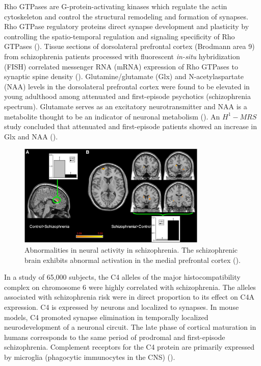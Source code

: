 \documentclass[]{article}
\begin{document}
		Rho GTPases are G-protein-activating kinases which regulate the actin cytoskeleton and control the structural remodeling and formation of synapses. Rho GTPase regulatory proteins direct synapse development and plasticity by controlling the spatio-temporal regulation and signaling specificity of Rho GTPases (\cite{ToliasControlsynapsedevelopment2011}). Tissue sections of dorsolateral prefrontal cortex (Brodmann area 9) from schizophrenia patients processed with fluorescent \textit{in-situ} hybridization (FISH) correlated messenger RNA (mRNA) expression of Rho GTPases to synaptic spine density (\cite{BoksaAbnormalsynapticpruning2012,HillMolecularmechanismscontributing2006}). Glutamine/glutamate (Glx) and N-acetylaspartate (NAA) levels in the dorsolateral prefrontal cortex were found to be elevated in young adulthood among attenuated and first-episode psychotics (schizophrenia spectrum). Glutamate serves as an excitatory neurotransmitter and NAA is a metabolite thought to be an indicator of neuronal metabolism (\cite{BoksaAbnormalsynapticpruning2012}). An $H^1-MRS$ study concluded that attenuated and first-episode patients showed an increase in Glx and NAA (\cite{LiemburgPrefrontalNAAGlx2016}).
		
		\begin{figure}
			\centering
			\includegraphics[width=0.8\textwidth]{graphics/AbnormalitiesNeuralActivity}
			\caption{Abnormalities in neural activity in schizophrenia. The schizophrenic brain exhibits abnormal activation in the medial prefrontal cortex (\cite{OngurDefaultmodenetwork2010}).}
		\end{figure}	
		
		In a study of 65,000 subjects, the C4 alleles of the major histocompatibility complex on chromosome 6 were highly correlated with schizophrenia. The alleles associated with schizophrenia risk were in direct proportion to its effect on C4A expression. C4 is expressed by neurons and localized to synapses. In mouse models, C4 promoted synapse elimination in temporally localized neurodevelopment of a neuronal circuit. The late phase of cortical maturation in humans corresponds to the same period of prodromal and first-episode schizophrenia. Complement receptors for the C4 protein are primarily expressed by microglia (phagocytic immunocytes in the CNS) (\cite{SekarSchizophreniariskcomplex2016}).
		
\end{document}
